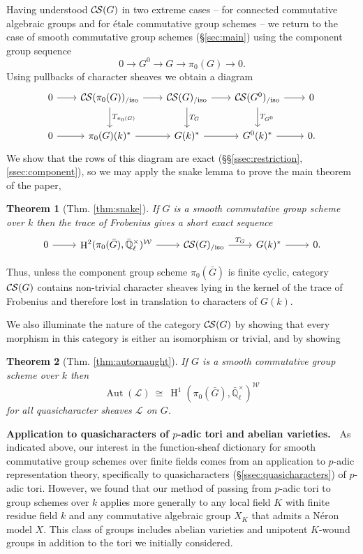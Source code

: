 \documentclass[10pt]{amsart}
\theoremstyle{plain}
\newtheorem*{theorem*}{Theorem}
\theoremstyle{definition}
\newcommand{\EE}{\mathbb{\bar Q}_\ell}
\newcommand{\Fq}{k}
\newcommand{\EEx}{\EE^\times}
\newcommand{\Weil}[1]{\mathcal{W}_{#1}}
\DeclareMathOperator{\Aut}{Aut}
\DeclareMathOperator{\Hh}{H}
\newcommand{\iso}{{\ \cong\ }}
\newcommand{\TrFrob}[1]{T_{#1}}
\newcommand{\cs}[1]{{\mathcal{#1}}}
\newcommand{\CS}{{\mathcal{C\hskip-0.8pt S}}}
\newcommand{\CSiso}[1]{\CS(#1)_{/\text{iso}}}
\newcommand{\bG}{\bar{G}}
\begin{document}
Having understood $\CS(G)$ in two extreme cases --
for connected commutative algebraic groups and for \'etale commutative group schemes -- we return to the case of smooth commutative group schemes (\S\ref{sec:main}) using the component group sequence
\[
0 \to G^0 \to G \to \pi_0(G) \to 0.
\]
Using pullbacks of character sheaves we obtain a diagram
\[
  \begin{tikzcd}[row sep=20, column sep=20]
    0 \rar & \CSiso{\pi_0(G)} \rar \dar{\TrFrob{\pi_0(G)}}
    & \CSiso{G} \rar \dar{\TrFrob{G}} & \CSiso{G^0} \rar \dar{\TrFrob{G^0}} & 0\\
    0 \rar & \pi_0(G)(\Fq)^* \rar & G(\Fq)^* \rar & G^0(\Fq)^* \rar & 0.
  \end{tikzcd}
\]
We show that the rows of this diagram are exact (\S\S\ref{ssec:restriction},\ref{ssec:component}), so we may apply the snake lemma to prove the main theorem of the paper,
\begin{theorem*}[{Thm. \ref{thm:snake}}]
If $G$ is a smooth commutative group scheme over $\Fq$ then the trace of Frobenius gives a short exact sequence
\[
\begin{tikzcd}
0 \arrow{r} & \Hh^2(\pi_0(\bG),\EEx)^{\Weil{}} \arrow{r} & \CSiso{G} \arrow{r}{\TrFrob{G}} & G(\Fq)^* \arrow{r} & 0.
\end{tikzcd}
\]
\end{theorem*}
\noindent
Thus, unless the component group scheme $\pi_0(\bG)$ is finite cyclic, category $\CS(G)$ contains non-trivial character sheaves lying in the kernel of the trace of Frobenius and therefore lost in translation to characters of $G(\Fq)$.


We also illuminate the nature of the category $\CS(G)$ by showing that every morphism in this category is either an isomorphism or trivial, and by showing
\begin{theorem*}[{Thm. \ref{thm:autornaught}}]
If $G$ is a smooth commutative group scheme over $\Fq$ then
\[
\Aut(\cs{L}) \iso  \Hh^1(\pi_0(\bG), \EEx)^{\Weil{}}
\]
for all quasicharacter sheaves $\cs{L}$ on $G$.
\end{theorem*}

\medskip
\noindent\textbf{Application to quasicharacters of $p$-adic tori and abelian varieties.\ }
As indicated above, our interest in the function-sheaf dictionary for smooth commutative group schemes
over finite fields comes from an application to $p$-adic representation theory,
specifically to quasicharacters (\S\ref{ssec:quasicharacters}) of $p$-adic tori.
However, we found that our method of passing from $p$-adic tori to group schemes over $\Fq$ applies more generally to
any local field $K$ with finite residue field $\Fq$ and any commutative algebraic group $X_K$ that admits a N\'eron model $X$.
This class of groups includes abelian varieties and unipotent $K$-wound groups in addition to the tori we initially considered.
\end{document}
